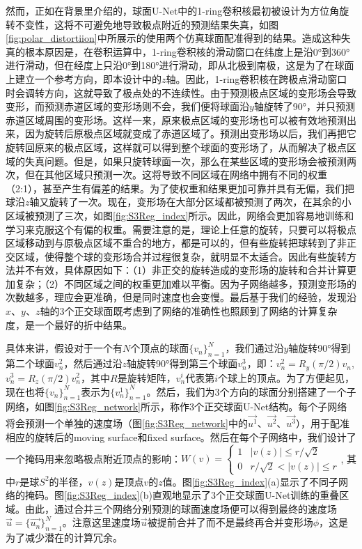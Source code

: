 然而，正如在背景里介绍的，球面U-Net中的1-ring卷积核最初被设计为方位角旋转不变性，这将不可避免地导致极点附近的预测结果失真，如图\ref{fig:polar_distortiion}中所展示的使用两个仿真球面配准得到的结果。造成这种失真的根本原因是，在卷积运算中，1-ring卷积核的滑动窗口在纬度上是沿0°到360°进行滑动，但在经度上只沿0°到180°进行滑动，即从北极到南极，这是为了在球面上建立一个参考方向，即本设计中的$z$轴。因此，1-ring卷积核在跨极点滑动窗口时会调转方向，这就导致了极点处的不连续性。由于预测极点区域的变形场会导致变形，而预测赤道区域的变形场则不会，我们便将球面沿$y$轴旋转了90°，并只预测赤道区域周围的变形场。这样一来，原来极点区域的变形场也可以被有效地预测出来，因为旋转后原极点区域就变成了赤道区域了。预测出变形场以后，我们再把它旋转回原来的极点区域，这样就可以得到整个球面的变形场了，从而解决了极点区域的失真问题。但是，如果只旋转球面一次，那么在某些区域的变形场会被预测两次，但在其他区域只预测一次。这将导致不同区域在网络中拥有不同的权重（2:1），甚至产生有偏差的结果。为了使权重和结果更加可靠并具有无偏，我们把球沿$z$轴又旋转了一次。现在，变形场在大部分区域都被预测了两次，在其余的小区域被预测了三次，如图\ref{fig:S3Reg_index}所示。因此，网络会更加容易地训练和学习来克服这个有偏的权重。需要注意的是，理论上任意的旋转，只要可以将极点区域移动到与原极点区域不重合的地方，都是可以的，但有些旋转把球转到了非正交区域，使得整个球的变形场合并过程很复杂，就明显不太适合。因此有些旋转方法并不有效，具体原因如下：（1）非正交的旋转造成的变形场的旋转和合并计算更加复杂；（2）不同区域之间的权重更加难以平衡。因为子网络越多，预测变形场的次数越多，理应会更准确，但是同时速度也会变慢。最后基于我们的经验，发现沿$x$、$y$、$z$轴的3个正交球面既考虑到了网络的准确性也照顾到了网络的计算复杂度，是一个最好的折中结果。

具体来讲，假设对于一个有$N$个顶点的球面${\{v_n\}}_{n=1}^N$，我们通过沿$y$轴旋转\ang{90}得到第二个球面${v_n^2}$，然后通过沿$z$轴旋转\ang{90}得到第三个球面${v_n^3}$，即：$v_n^2=R_y(\pi/2)v_n$, $v_n^3=R_z(\pi/2)v_n^2$，其中$R$是旋转矩阵，${v_n^i}$代表第$i$个球上的顶点。为了方便起见，现在也将${\{v_n\}}_{n=1}^N$表示为${\{v_n^1\}}_{n=1}^N$。然后，我们为3个方向的球面分别搭建了一个子网络，如图\ref{fig:S3Reg_network}所示，称作3个正交球面U-Net结构。每个子网络将会预测一个单独的速度场（图\ref{fig:S3Reg_network}中的$\overrightarrow{u^1}$、$\overrightarrow{u^2}$、$\overrightarrow{u^3}$），用于配准相应的旋转后的moving surface和fixed surface。然后在每个子网络中，我们设计了一个掩码用来忽略极点附近顶点的影响：$
	W(v)=\begin{cases} 
	1 & |v(z)| \leq r/\sqrt{2} \\
	0 & r/\sqrt{2} < |v(z)| \leq r  
	\end{cases}
$, 其中$r$是球$S^2$的半径，$v(z)$是顶点$v$的$z$值。图\ref{fig:S3Reg_index}(a)显示了不同子网络的掩码。图\ref{fig:S3Reg_index}(b)直观地显示了3个正交球面U-Net训练的重叠区域。由此，通过合并三个网络分别预测的球面速度场便可以得到最终的速度场$\overrightarrow{u}=\{\overrightarrow{u_n}\}_{n=1}^N$。注意这里速度场$\overrightarrow{u}$被提前合并了而不是最终再合并变形场$\phi$，这是为了减少潜在的计算冗余。

